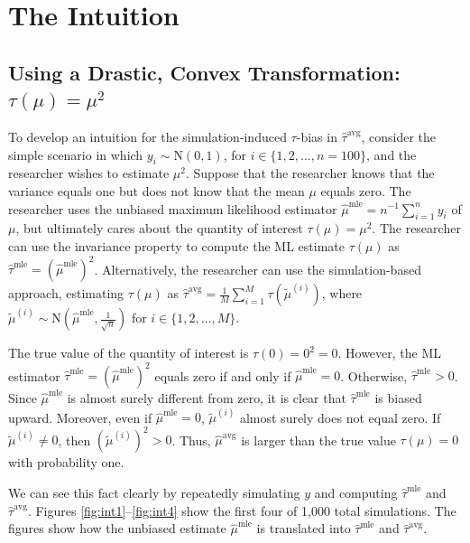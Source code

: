 \documentclass[11pt]{article}
\begin{document}

\section*{The Intuition}

\subsection*{Using a Drastic, Convex Transformation: $\tau(\mu) = \mu^2$}

To develop an intuition for the simulation-induced $\tau$-bias in $\hat{\tau}^\text{avg}$, consider the simple scenario in which $y_i \sim \text{N}(0, 1)$, for $i \in \{1, 2, \ldots, n = 100\}$, and the researcher wishes to estimate $\mu^2$. Suppose that the researcher knows that the variance equals one but does not know that the mean $\mu$ equals zero. The researcher uses the unbiased maximum likelihood estimator $\hat{\mu}^\text{mle} = n^{-1}\sum_{i=1}^n y_i$ of $\mu$, but ultimately cares about the quantity of interest $\tau(\mu) = \mu^2$. The researcher can use the invariance property to compute the ML estimate $\tau(\mu)$ as $\hat{\tau}^\text{mle} = \left( \hat{\mu}^\text{mle} \right) ^2$. Alternatively, the researcher can use the simulation-based approach, estimating $\tau(\mu)$ as $\hat{\tau}^\text{avg} = \frac{1}{M} \sum_{i = 1}^M \tau \left( \tilde{\mu}^{(i)} \right)$, where $\tilde{\mu}^{(i)} \sim \text{N} \left( \hat{\mu}^\text{mle}, \frac{1}{\sqrt{n}} \right)$ for $i \in \{1, 2,\ldots, M\}$.


The true value of the quantity of interest is $\tau(0) = 0^2 = 0$. However, the ML estimator $\hat{\tau}^\text{mle} = \left( \hat{\mu}^\text{mle} \right)^2$ equals zero if and only if $\hat{\mu}^\text{mle} = 0$. Otherwise, $\hat{\tau}^\text{mle} > 0$. Since $\hat{\mu}^\text{mle}$ is almost surely different from zero, it is clear that $\hat{\tau}^\text{mle}$ is biased upward.
Moreover, even if $\hat{\mu}^\text{mle} = 0$, $\tilde{\mu}^{(i)}$ almost surely does not equal zero. If $\tilde{\mu}^{(i)} \neq 0$, then $\left( \tilde{\mu}^{(i)} \right)^2 > 0$. Thus, $\hat{\mu}^\text{avg}$ is larger than the true value $\tau(\mu) = 0$ with probability one.


We can see this fact clearly by repeatedly simulating $y$ and computing $\hat{\tau}^\text{mle}$ and $\hat{\tau}^\text{avg}$. Figures \ref{fig:int1}--\ref{fig:int4} show the first four of 1,000 total simulations. The figures show how the unbiased estimate $\hat{\mu}^\text{mle}$ is translated into $\hat{\tau}^\text{mle}$ and $\hat{\tau}^\text{avg}$.
\end{document}
